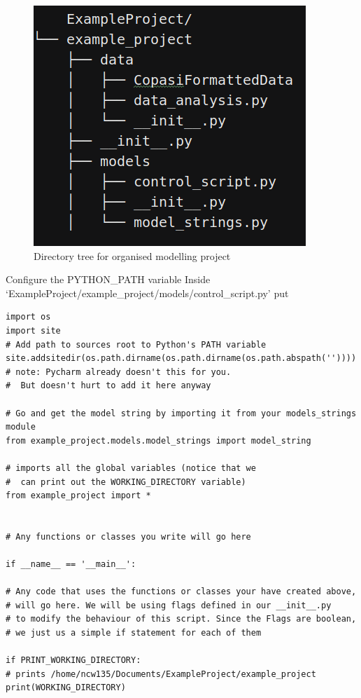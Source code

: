 \documentclass[../main]{subfiles}
\begin{document}


\begin{figure}
\centering
\includegraphics[width=0.4\linewidth]{EnvConfig/assets/example_project_config}
\caption{Directory tree for organised modelling project}
\label{fig:config:example_project}
\end{figure}


\begin{Task}{Configure the PYTHON\_PATH variable}
Inside `ExampleProject/example\_project/models/control\_script.py' put

\begin{verbatim}
import os
import site
# Add path to sources root to Python's PATH variable
site.addsitedir(os.path.dirname(os.path.dirname(os.path.abspath(''))))
# note: Pycharm already doesn't this for you.
#  But doesn't hurt to add it here anyway

# Go and get the model string by importing it from your models_strings module
from example_project.models.model_strings import model_string

# imports all the global variables (notice that we
#  can print out the WORKING_DIRECTORY variable)
from example_project import *


# Any functions or classes you write will go here

if __name__ == '__main__':

# Any code that uses the functions or classes your have created above,
# will go here. We will be using flags defined in our __init__.py
# to modify the behaviour of this script. Since the Flags are boolean,
# we just us a simple if statement for each of them

if PRINT_WORKING_DIRECTORY:
# prints /home/ncw135/Documents/ExampleProject/example_project
print(WORKING_DIRECTORY)

\end{verbatim}
\end{Task}
\end{document}
